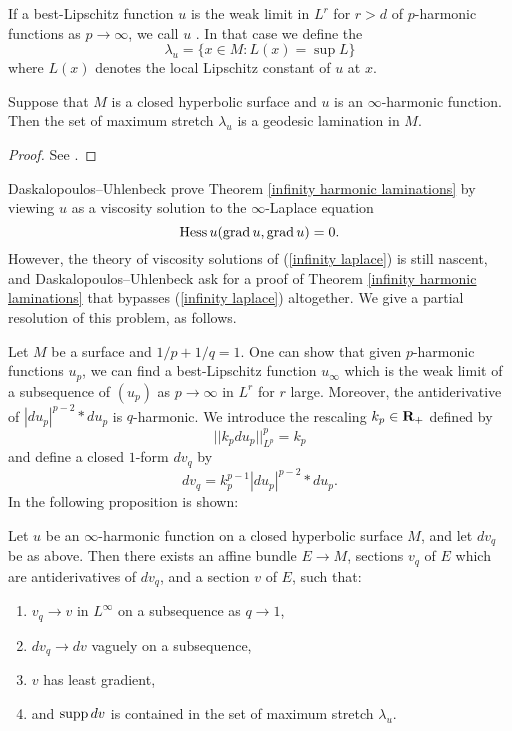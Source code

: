 \begin{definition}
If a best-Lipschitz function $u$ is the weak limit in $L^r$ for $r > d$ of $p$-harmonic functions as $p \to \infty$, we call $u$ .
In that case we define the 
$$\lambda_u = \{x \in M: L(x) = \sup L\}$$
where $L(x)$ denotes the local Lipschitz constant of $u$ at $x$.
\end{definition}

\begin{theorem}\label{infinity harmonic laminations}
Suppose that $M$ is a closed hyperbolic surface and $u$ is an $\infty$-harmonic function. Then the set of maximum stretch $\lambda_u$ is a geodesic lamination in $M$.
\end{theorem}
\begin{proof}
See \cite[\S5]{daskalopoulos2020transverse}.
\end{proof}

Daskalopoulos--Uhlenbeck prove Theorem \ref{infinity harmonic laminations} by viewing $u$ as a viscosity solution to the $\infty$-Laplace equation
\begin{equation}\label{infinity laplace}
    \operatorname{Hess} u(\operatorname{grad} u, \operatorname{grad} u) = 0.
\end{equation}
However, the theory of viscosity solutions of (\ref{infinity laplace}) \cite{Aronsson1984} \cite{Evans08} is still nascent, and Daskalopoulos--Uhlenbeck ask for a proof of Theorem \ref{infinity harmonic laminations} that bypasses (\ref{infinity laplace}) altogether.
We give a partial resolution of this problem, as follows.

Let $M$ be a surface and $1/p + 1/q = 1$.
One can show that given $p$-harmonic functions $u_p$, we can find a best-Lipschitz function $u_\infty$ which is the weak limit of a subsequence of $(u_p)$ as $p \to \infty$ in $L^r$ for $r$ large.
Moreover, the antiderivative of $|du_p|^{p - 2} * du_p$ is $q$-harmonic.
We introduce the rescaling $k_p \in \mathbf{R}_+$ defined by
$$||k_p du_p||_{L^p}^p = k_p$$
and define a closed $1$-form $dv_q$ by
$$dv_q = k_p^{p - 1} |du_p|^{p - 2} * du_p.$$
In \cite[\S6]{daskalopoulos2020transverse} the following proposition is shown:

\begin{proposition}\label{existence of dual sections}
Let $u$ be an $\infty$-harmonic function on a closed hyperbolic surface $M$, and let $dv_q$ be as above. Then there exists an affine bundle $E \to M$, sections $v_q$ of $E$ which are antiderivatives of $dv_q$, and a section $v$ of $E$, such that:
\begin{enumerate}
\item $v_q \to v$ in $L^\infty$ on a subsequence as $q \to 1$,
\item $dv_q \to dv$ vaguely on a subsequence,
\item $v$ has least gradient,
\item and $\operatorname{supp} dv$ is contained in the set of maximum stretch $\lambda_u$.
\end{enumerate}
\end{proposition}

